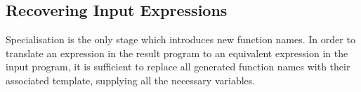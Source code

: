 \subsection{Recovering Input Expressions}

Specialisation is the only stage which introduces new function names. In order to translate an expression in the result program to an equivalent expression in the input program, it is sufficient to replace all generated function names with their associated template, supplying all the necessary variables.


\begin{comment}
\subsection{Allowing |main| to return a functional value}
\label{secF:main_relax}

\begin{examplename}{Root function returning functional values}
\label{exF:root_function_functional}
\begin{code}
main = [id]
\end{code}

In this example, the |main| function returns a functional value inside a constructor, i.e. a boxed lambda. We cannot remove the functional value without changing the semantics of the |main| function, which is called from outside the our program, and hence cannot be altered. A related situation is:

\begin{code}
main = id
\end{code}

Here we can only reduce this program to first-order if we are allowed to increase the arity of |main| from 0 to 1. This situation occurs frequently in Haskell programs, whose |main| definition is typically of type \ignore|IO ()|. In the Yhc compiler, used to generate our Core language, the definition of |IO| is:

\begin{code}
newtype IO alpha = IO (World -> One alpha)
data One alpha = One alpha
\end{code}

At compilation time the |newtype| wrapper is removed, leaving a function from |World| to \ignore|One alpha|. The |main| argument therefore takes a |World| parameter, before returning a first-order result. We permit the increasing of the arity of |main|.
\end{examplename}

\begin{examplename}{Root function taking functional values}
\begin{code}
main f = f id
\end{code}

In this example, the |main| function takes a functional argument |f|, which is applied to |id| -- a functional value. Since the interface to |f| is outside the control of the code we are transforming, we cannot remove the functional value.
\end{examplename}
\end{comment}

